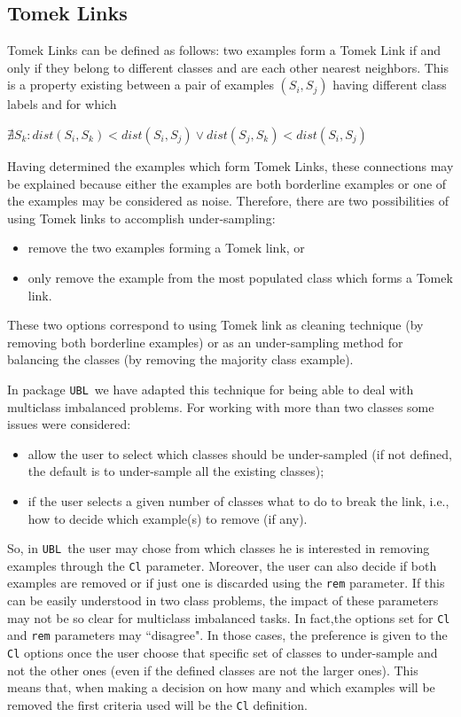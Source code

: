 \documentclass[10pt,a4paper]{article}\usepackage[]{graphicx}\usepackage[]{color}
\newcommand{\UBL}{\texttt{UBL}\ }
\newcommand{\pUBL}{package \texttt{UBL}\ }
\begin{document}
\subsection{Tomek Links}\label{sec:Tomek}

Tomek Links \cite{tomek1976two} can be defined as follows: two examples form a Tomek Link if and only if they belong to different classes and are each other nearest neighbors. This is a property existing between a pair of examples $(S_i, S_j)$ having different class labels and for which 

$\nexists S_k : dist(S_i,S_k) < dist(S_i,S_j) \vee dist(S_j, S_k)<dist(S_i,S_j)$

\noindent Having determined the examples which form Tomek Links, these connections may be explained because either the examples are both borderline examples or one of the examples may be considered as noise.
Therefore, there are two possibilities of using Tomek links to accomplish under-sampling:
\begin{itemize}
  \item remove the two examples forming a Tomek link, or
  \item only remove the example from the most populated class which forms a Tomek link.
\end{itemize}

These two options correspond to using Tomek link as cleaning technique (by removing both borderline examples) or as an under-sampling method for balancing the classes (by removing the majority class example).


In \pUBL we have adapted this technique for being able to deal with multiclass imbalanced problems. 
For working with more than two classes some issues were considered: 
\begin{itemize}
\item allow the user to select which classes should be under-sampled (if not defined, the default is to under-sample all the existing classes);
\item if the user selects a given number of classes what to do to break the link, i.e., how to decide which example(s) to remove (if any). 
\end{itemize}
So, in \UBL the user may chose from which classes he is interested in removing examples through the \texttt{Cl} parameter. Moreover, the user can also decide if both examples are removed or if just one is discarded using the \texttt{rem} parameter. If this can be easily understood in two class problems, the impact of these parameters may not be so clear for multiclass imbalanced tasks. 
In fact,the options set for \texttt{Cl} and \texttt{rem} parameters may ``disagree". In those cases, the preference is given to the \texttt{Cl} options once the user choose that specific set of classes to under-sample and not the other ones (even if the defined classes are not the larger ones). This means that, when making a decision on how many and which examples will be removed the first criteria used will be the \texttt{Cl} definition.
\end{document}
